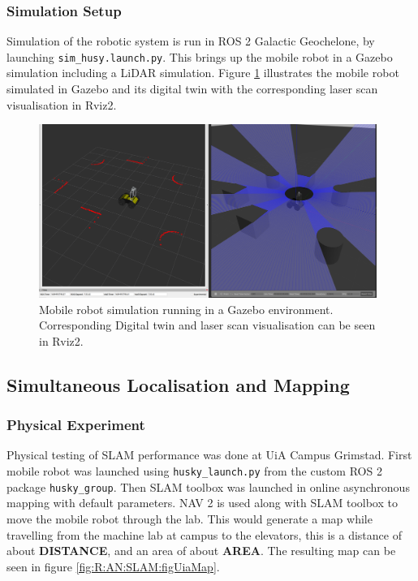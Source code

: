 \subsubsection{Simulation Setup}
Simulation of the robotic system is run in ROS 2 Galactic Geochelone, by launching \lstinline{sim_husy.launch.py}. This brings up the mobile robot in a Gazebo simulation including a LiDAR simulation. Figure \ref{fig:R:CMR:gazeboSim} illustrates the mobile robot simulated in Gazebo and its digital twin with the corresponding laser scan visualisation in Rviz2.

\begin{figure}[H]
  \centering
  \includegraphics[width = 0.98\textwidth]{Figures/figHuskyGazebo.pdf}
  \caption{Mobile robot simulation running in a Gazebo environment. Corresponding Digital twin and laser scan visualisation can be seen in Rviz2. }
  \label{fig:R:CMR:gazeboSim}
\end{figure}

\subsection{Simultaneous Localisation and Mapping}\label{sec:R:AN:SLAM}
\subsubsection{Physical Experiment}
Physical testing of SLAM performance was done at UiA Campus Grimstad. First mobile robot was launched using \lstinline{husky_launch.py} from the custom ROS 2 package \lstinline{husky_group}. Then SLAM toolbox was launched in online asynchronous mapping with default parameters. NAV 2 is used along with SLAM toolbox to move the mobile robot through the lab. This would generate a map while travelling from the machine lab at campus to the elevators, this is a distance of about \textbf{DISTANCE}, and an area of about \textbf{AREA}. The resulting map can be seen in figure \ref{fig:R:AN:SLAM:figUiaMap}.

